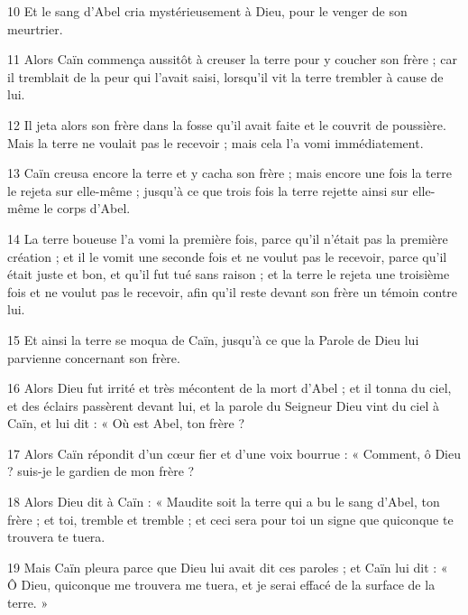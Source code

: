 \par 10 Et le sang d'Abel cria mystérieusement à Dieu, pour le venger de son meurtrier.

\par 11 Alors Caïn commença aussitôt à creuser la terre pour y coucher son frère ; car il tremblait de la peur qui l'avait saisi, lorsqu'il vit la terre trembler à cause de lui.

\par 12 Il jeta alors son frère dans la fosse qu'il avait faite et le couvrit de poussière. Mais la terre ne voulait pas le recevoir ; mais cela l'a vomi immédiatement.

\par 13 Caïn creusa encore la terre et y cacha son frère ; mais encore une fois la terre le rejeta sur elle-même ; jusqu'à ce que trois fois la terre rejette ainsi sur elle-même le corps d'Abel.

\par 14 La terre boueuse l'a vomi la première fois, parce qu'il n'était pas la première création ; et il le vomit une seconde fois et ne voulut pas le recevoir, parce qu'il était juste et bon, et qu'il fut tué sans raison ; et la terre le rejeta une troisième fois et ne voulut pas le recevoir, afin qu'il reste devant son frère un témoin contre lui.

\par 15 Et ainsi la terre se moqua de Caïn, jusqu'à ce que la Parole de Dieu lui parvienne concernant son frère.

\par 16 Alors Dieu fut irrité et très mécontent de la mort d'Abel ; et il tonna du ciel, et des éclairs passèrent devant lui, et la parole du Seigneur Dieu vint du ciel à Caïn, et lui dit : « Où est Abel, ton frère ?

\par 17 Alors Caïn répondit d'un cœur fier et d'une voix bourrue : « Comment, ô Dieu ? suis-je le gardien de mon frère ?

\par 18 Alors Dieu dit à Caïn : « Maudite soit la terre qui a bu le sang d'Abel, ton frère ; et toi, tremble et tremble ; et ceci sera pour toi un signe que quiconque te trouvera te tuera.

\par 19 Mais Caïn pleura parce que Dieu lui avait dit ces paroles ; et Caïn lui dit : « Ô Dieu, quiconque me trouvera me tuera, et je serai effacé de la surface de la terre. »

